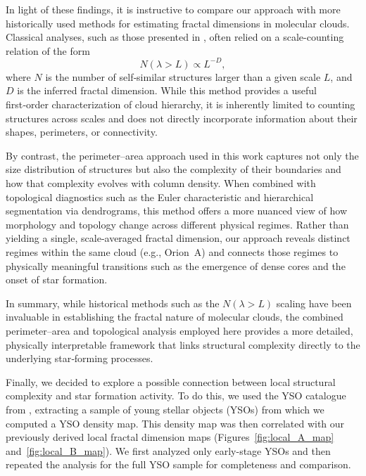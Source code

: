 In light of these findings, it is instructive to compare our approach with more historically used methods for estimating fractal dimensions in molecular clouds.  
Classical analyses, such as those presented in \cite{elmegreen1996fractal}, often relied on a scale-counting relation of the form
\[
N(\lambda > L) \propto L^{-D},
\]
where \(N\) is the number of self‑similar structures larger than a given scale \(L\), and \(D\) is the inferred fractal dimension.  
While this method provides a useful first‑order characterization of cloud hierarchy, it is inherently limited to counting structures across scales and does not directly incorporate information about their shapes, perimeters, or connectivity.

By contrast, the perimeter–area approach used in this work captures not only the size distribution of structures but also the complexity of their boundaries and how that complexity evolves with column density.  
When combined with topological diagnostics such as the Euler characteristic and hierarchical segmentation via dendrograms, this method offers a more nuanced view of how morphology and topology change across different physical regimes.  
Rather than yielding a single, scale‑averaged fractal dimension, our approach reveals distinct regimes within the same cloud (e.g., Orion~A) and connects those regimes to physically meaningful transitions such as the emergence of dense cores and the onset of star formation.

In summary, while historical methods such as the \( N(\lambda > L) \) scaling have been invaluable in establishing the fractal nature of molecular clouds, the combined perimeter–area and topological analysis employed here provides a more detailed, physically interpretable framework that links structural complexity directly to the underlying star‑forming processes.

Finally, we decided to explore a possible connection between local structural complexity and star formation activity. To do this, we used the YSO catalogue from \cite{megeath2012catalogue}, extracting a sample of young stellar objects (YSOs) from which we computed a YSO density map. This density map was then correlated with our previously derived local fractal dimension maps (Figures~\ref{fig:local_A_map} and~\ref{fig:local_B_map}). We first analyzed only early-stage YSOs and then repeated the analysis for the full YSO sample for completeness and comparison.


